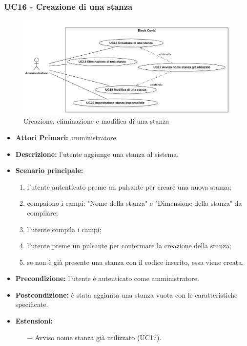\subsubsection{ UC16 - Creazione di una stanza}
\begin{figure}[H]
	\centering
	\includegraphics[width=17cm]{res/images/UC16-17-18-19-20.png}
	\caption{Creazione, eliminazione e modifica di una stanza}
\end{figure}
\begin{itemize}
	\item\textbf{Attori Primari:}
	amministratore.
	\item\textbf{Descrizione:} 
	l'utente aggiunge una stanza al sistema.
	\item\textbf{Scenario principale:} 
	\begin{enumerate}
		\item l'utente autenticato preme un pulsante per creare una nuova stanza;
		\item compaiono i campi: "Nome della stanza" e "Dimensione della stanza" da compilare;
		\item l'utente compila i campi;
		\item l'utente preme un pulsante per confermare la creazione della stanza;
		\item se non è già presente una stanza con il codice inserito, essa viene creata.
	\end{enumerate}
	\item\textbf{Precondizione:} 
	l'utente è autenticato come amministratore.
	\item\textbf{Postcondizione:}
	è stata aggiunta una stanza vuota con le caratteristiche specificate.
	\item\textbf{Estensioni:}
	\begin{itemize}
		\item[$-$] Avviso nome stanza già utilizzato (UC17).
	\end{itemize}
\end{itemize}

